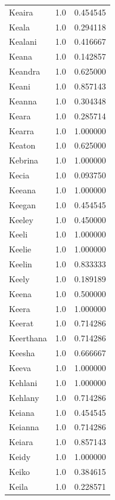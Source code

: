 \documentclass[
  letterpaper,
  DIV=11,
  numbers=noendperiod]{scrreprt}
\begin{document}
\begin{tabular}{lrr}
Keaira          &   1.0 &   0.454545 \\
Keala           &   1.0 &   0.294118 \\
Kealani         &   1.0 &   0.416667 \\
Keana           &   1.0 &   0.142857 \\
Keandra         &   1.0 &   0.625000 \\
Keani           &   1.0 &   0.857143 \\
Keanna          &   1.0 &   0.304348 \\
Keara           &   1.0 &   0.285714 \\
Kearra          &   1.0 &   1.000000 \\
Keaton          &   1.0 &   0.625000 \\
Kebrina         &   1.0 &   1.000000 \\
Kecia           &   1.0 &   0.093750 \\
Keeana          &   1.0 &   1.000000 \\
Keegan          &   1.0 &   0.454545 \\
Keeley          &   1.0 &   0.450000 \\
Keeli           &   1.0 &   1.000000 \\
Keelie          &   1.0 &   1.000000 \\
Keelin          &   1.0 &   0.833333 \\
Keely           &   1.0 &   0.189189 \\
Keena           &   1.0 &   0.500000 \\
Keera           &   1.0 &   1.000000 \\
Keerat          &   1.0 &   0.714286 \\
Keerthana       &   1.0 &   0.714286 \\
Keesha          &   1.0 &   0.666667 \\
Keeva           &   1.0 &   1.000000 \\
Kehlani         &   1.0 &   1.000000 \\
Kehlany         &   1.0 &   0.714286 \\
Keiana          &   1.0 &   0.454545 \\
Keianna         &   1.0 &   0.714286 \\
Keiara          &   1.0 &   0.857143 \\
Keidy           &   1.0 &   1.000000 \\
Keiko           &   1.0 &   0.384615 \\
Keila           &   1.0 &   0.228571 \\

\end{tabular}
\end{document}
